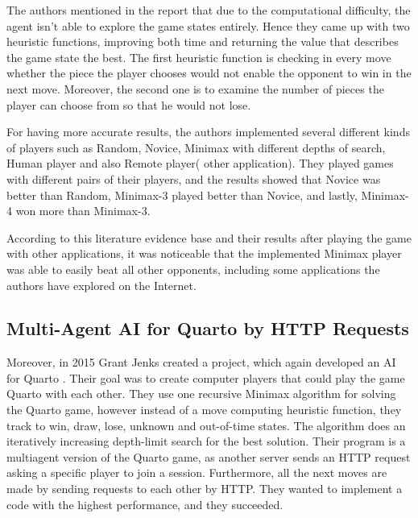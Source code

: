 \documentclass[paper=a4, fontsize=11pt]{article} %
\begin{document}
The authors mentioned in the report that due to the computational difficulty, the agent isn’t able to explore the game states entirely. Hence they came up with two heuristic functions, improving both time and returning the value that describes the game state the best. The first heuristic function is checking in every move whether the piece the player chooses would not enable the opponent to win in the next move. Moreover, the second one is to examine the number of pieces the player can choose from so that he would not lose.

For having more accurate results, the authors implemented several different kinds of players such as Random, Novice, Minimax with different depths of search, Human player and also Remote player( other application). They played games with different pairs of their players, and the results showed that Novice was better than Random, Minimax-3 played better than Novice, and lastly, Minimax-4 won more than Minimax-3.

According to this literature evidence base and their results after playing the game with other applications, it was noticeable that the implemented Minimax player was able to easily beat all other opponents, including some applications the authors have explored on the Internet. 
\subsection{Multi-Agent AI for Quarto by HTTP Requests}
Moreover, in 2015 Grant Jenks created a project, which again developed an AI for Quarto \cite{QuartoJenks}. Their goal was to create computer players that could play the game Quarto with each other. They use one recursive Minimax algorithm for solving the Quarto game, however instead of a move computing heuristic function, they track to win, draw, lose, unknown and out-of-time states. The algorithm does an iteratively increasing depth-limit search for the best solution. Their program is a multiagent version of the Quarto game, as another server sends an HTTP request asking a specific player to join a session. Furthermore, all the next moves are made by sending requests to each other by HTTP. They wanted to implement a code with the highest performance, and they succeeded. 
\end{document}
